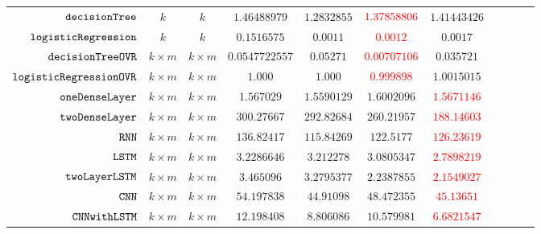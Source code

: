 {\begin {table}[H]
\begin{center}
{\begin{tabular}{| >{\tiny}r | c | c | c | c | c | c | c | c | c | c  }
         $\mathtt{decisionTree}$ & $k$ &  $k$ & $ 1.46488979 $  & $ 1.2832855 $ & $ \textcolor{red}{1.37858806} $ & {$1.41443426 $}  \\
         $  \mathtt{logisticRegression}$ & $k$ &  $k$ & $ 0.1516575 $  &  $ 0.0011 $ & \textcolor{red}{$0.0012$} & {$0.0017$}   \\
         $  \mathtt{decisionTreeOVR}$ & $k \times m$ &  $ k \times m $ &  $0.0547722557  $ & $0.05271$  &  \textcolor{red}{$0.00707106 $} & $0.035721$  \\
         $  \mathtt{logisticRegressionOVR}$    & $k \times m$ &  $ k \times m $ &  $ 1.000  $  &  $ 1.000 $ & \textcolor{red}{$ 0.999898$} & $ 1.0015015 $ \\
         $  \mathtt{oneDenseLayer}$ & $ k \times m  $  & $ k \times m $   &  $ 1.567029  $  &  {$ 1.5590129 $} & $1.6002096$ & \textcolor{red}{$ 1.5671146 $}  \\
         {$ \mathtt{twoDenseLayer}$} & $ k \times m  $  & $ k \times m $ &  $ 300.27667 $  &  $ 292.82684 $ & $ 260.21957 $ & \textcolor{red}{$ 188.14603 $}  \\
         $  \mathtt{RNN}$           & $ k \times m  $  & $ k \times m $ &  $ 136.82417 $  &  $ 115.84269 $ & $ 122.5177 $ & \textcolor{red}{$ 126.23619 $}  \\
         $  \mathtt{LSTM}$          & $ k \times m $   &  $ k \times m $  &  $ 3.2286646  $  &  $ 3.212278 $ & $3.0805347$ & \textcolor{red}{${2.7898219}$}  \\
         $  \mathtt{twoLayerLSTM}$  & $ k \times m $ &  $ k \times m $  &  $ 3.465096  $  &  $3.2795377$ & {${2.2387855}$} & \textcolor{red}{$2.1549027$}  \\
         $ \mathtt{CNN}$ & $ k \times m $ &  $  k \times m $ &  $54.197838$  &  $44.91098$ & $48.472355$ & \textcolor{red}{$45.13651$}  \\
         $ \mathtt{CNNwithLSTM}$ & $ k \times m $ &  $ k \times m $ &  $ 12.198408  $  &  $  8.806086$ & $ 10.579981 $ & \textcolor{red}{$ 6.6821547 $} \\
         \hline \hline
        \end{tabular}
}
\end{center}
\end{table}
}


